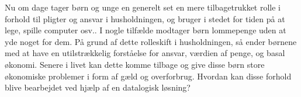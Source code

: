 Nu om dage tager børn og unge en generelt set en mere tilbagetrukket rolle i forhold til pligter og ansvar i husholdningen, og bruger i stedet for tiden på at lege, spille computer osv.. I nogle tilfælde modtager børn lommepenge uden at yde noget for dem.\cite{Boerneliv} På grund af dette rolleskift i husholdningen, så ender børnene med at have en utilstrækkelig forståelse for ansvar, værdien af penge, og basal økonomi.\cite{BusinessDK2} Senere i livet kan dette komme tilbage og give disse børn store økonomiske problemer i form af gæld og overforbrug. Hvordan kan disse forhold blive bearbejdet ved hjælp af en datalogisk løsning?